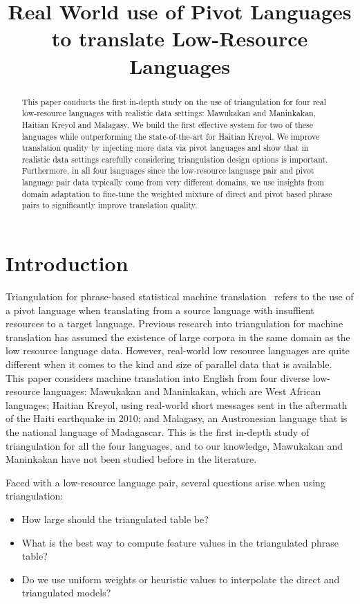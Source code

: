 \documentclass[11pt]{article}
\title{Real World use of Pivot Languages to translate Low-Resource Languages}
\author{}
\date{}
\begin{document}
\maketitle

\begin{abstract}
This paper conducts the first in-depth study on the use of triangulation for four real low-resource languages with realistic data settings: Mawukakan and Maninkakan, Haitian Kreyol and Malagasy. We build the first effective system for two of these languages while outperforming the state-of-the-art for Haitian Kreyol. We improve translation quality by injecting more data via pivot languages and show that in realistic data settings carefully considering triangulation design options is important. Furthermore, in all four languages since the low-resource language pair and pivot language pair data typically come from very different domains, we use insights from domain adaptation to fine-tune the weighted mixture of direct and pivot based phrase pairs to significantly improve translation quality.
\end{abstract}

\section{Introduction}
Triangulation for phrase-based statistical machine translation~\cite{Utiyama:07,Cohn:07} refers to the use of a pivot language when translating from a source language with insuffient resources to a target language. Previous research into triangulation for machine translation has assumed the existence of large corpora in the same domain as the low resource language data. However, real-world low resource languages are quite different when it comes to the kind and size of parallel data that is available. This paper considers machine translation into English from four diverse low-resource languages: Mawukakan and Maninkakan, which are West African languages;  Haitian Kreyol, using real-world short messages sent in the aftermath of the Haiti earthquake in 2010; and Malagasy, an Austronesian language that is the national language of Madagascar. This is the first in-depth study of triangulation for all the four languages, and to our knowledge, Mawukakan and Maninkakan have not been studied before in the literature.

Faced with a low-resource language pair, several questions arise when using triangulation: 
\begin{itemize}\addtolength{\itemsep}{-0.4\baselineskip}
	\item How large should the triangulated table be? 
	\item What is the best way to compute feature values in the triangulated phrase table? 
	\item Do we use uniform weights or heuristic values to interpolate the direct and triangulated models? 
\end{itemize}
\end{document}

